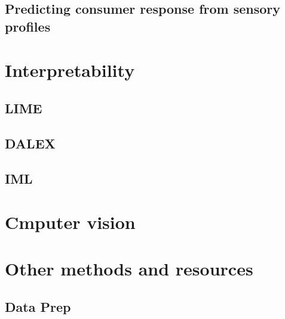 \documentclass[
]{book}
\begin{document}
\hypertarget{predicting-consumer-response-from-sensory-profiles}{%
\subsection{Predicting consumer response from sensory profiles}\label{predicting-consumer-response-from-sensory-profiles}}

\hypertarget{interpretability}{%
\section{Interpretability}\label{interpretability}}

\hypertarget{lime}{%
\subsection{LIME}\label{lime}}

\hypertarget{dalex}{%
\subsection{DALEX}\label{dalex}}

\hypertarget{iml}{%
\subsection{IML}\label{iml}}

\hypertarget{cmputer-vision}{%
\section{Cmputer vision}\label{cmputer-vision}}

\hypertarget{other-methods-and-resources}{%
\section{Other methods and resources}\label{other-methods-and-resources}}

\hypertarget{data-prep}{%
\subsection{Data Prep}\label{data-prep}}
\end{document}
